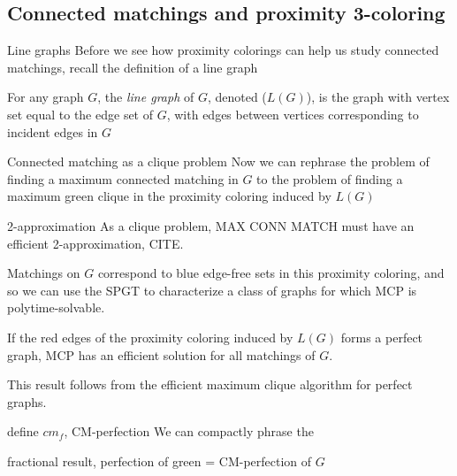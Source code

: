 \documentclass{beamer}
\newcommand{\bframe}[2]{\begin{frame}{#1} #2 \end{frame}}
\begin{document}
\subsection{Connected matchings and proximity 3-coloring}
\bframe{Line graphs}{Before we see how proximity colorings can help us study connected matchings, recall the definition of a line graph

For any graph $G$, the \textit{line graph} of $G$, denoted ($L(G)$), is the graph with vertex set equal to the edge set of $G$, with edges between vertices corresponding to incident edges in $G$

\quad }
\bframe{Connected matching as a clique problem}{Now we can rephrase the problem of finding a maximum connected matching in $G$ to the problem of finding a maximum green clique in the proximity coloring induced by $L(G)$}
\bframe{2-approximation}{As a clique problem, MAX CONN MATCH must have an efficient 2-approximation, CITE. }
\bframe{}{Matchings on $G$ correspond to blue edge-free sets in this proximity coloring, and so we can use the SPGT to characterize a class of graphs for which MCP is polytime-solvable.
 \begin{theorem}
  If the red edges of the proximity coloring induced by $L(G)$ forms a perfect graph, MCP has an efficient solution for all matchings of $G$.
 \end{theorem}}
This result follows from the efficient maximum clique algorithm for perfect graphs.  
\bframe{define $cm_f$, CM-perfection}{We can compactly phrase the }
\bframe{fractional result, perfection of green = CM-perfection of $G$}{}

\end{document}
